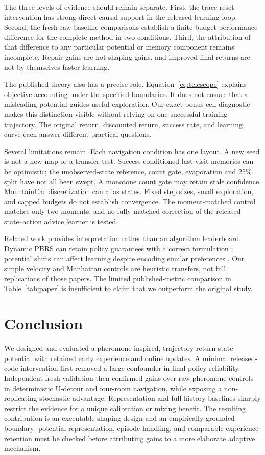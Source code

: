 \documentclass[10pt,twocolumn,letterpaper]{article}
\begin{document}
The three levels of evidence should remain separate. First, the trace-reset intervention has strong direct causal support in the released learning loop. Second, the fresh raw-baseline comparisons establish a finite-budget performance difference for the complete method in two conditions. Third, the attribution of that difference to any particular potential or memory component remains incomplete. Repair gains are not shaping gains, and improved final returns are not by themselves faster learning.

The published theory also has a precise role. Equation~\ref{eq:telescope} explains objective accounting under the specified boundaries. It does not ensure that a misleading potential guides useful exploration. Our exact bonus-cell diagnostic makes this distinction visible without relying on one successful training trajectory. The original return, discounted return, success rate, and learning curve each answer different practical questions.

Several limitations remain. Each navigation condition has one layout. A new seed is not a new map or a transfer test. Success-conditioned last-visit memories can be optimistic; the unobserved-state reference, count gate, evaporation and 25\% split have not all been swept. A monotone count gate may retain stale confidence. MountainCar discretization can alias states. Fixed step sizes, small exploration, and capped budgets do not establish convergence. The moment-matched control matches only two moments, and no fully matched correction of the released state--action advice learner is tested.

Related work provides interpretation rather than an algorithm leaderboard. Dynamic PBRS can retain policy guarantees with a correct formulation \citep{devlin2012}; potential shifts can affect learning despite encoding similar preferences \citep{muller2025}. Our simple velocity and Manhattan controls are heuristic transfers, not full replications of those papers. The limited published-metric comparison in Table~\ref{tab:paper} is insufficient to claim that we outperform the original study.

\FloatBarrier
\section{Conclusion}
We designed and evaluated a pheromone-inspired, trajectory-return state potential with retained early experience and online updates. A minimal released-code intervention first removed a large confounder in final-policy reliability. Independent fresh validation then confirmed gains over raw pheromone controls in deterministic U-detour and four-room navigation, while exposing a non-replicating stochastic advantage. Representation and full-history baselines sharply restrict the evidence for a unique calibration or mixing benefit. The resulting contribution is an executable shaping design and an empirically grounded boundary: potential representation, episode handling, and comparable experience retention must be checked before attributing gains to a more elaborate adaptive mechanism.
\end{document}
